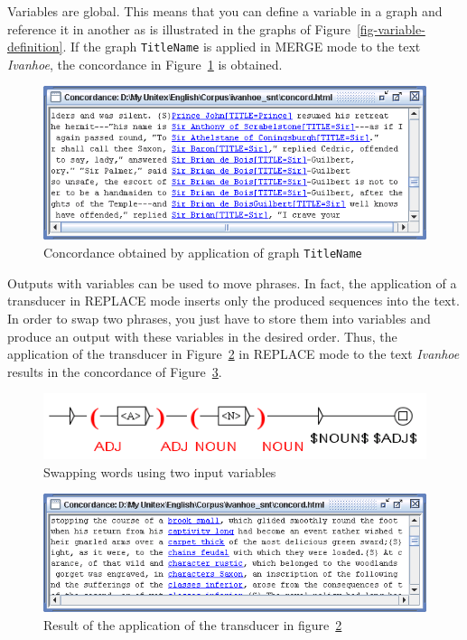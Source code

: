 \bigskip
\noindent Variables are global. This means that you can define a variable in a graph and
reference it in another as is illustrated in the graphs of
Figure~\ref{fig-variable-definition}. If the graph \verb+TitleName+ is applied in MERGE mode to the text
\textit{Ivanhoe}, the concordance in Figure~\ref{fig6-14} is obtained.

\begin{figure}[!p]
\begin{center}
\includegraphics[width=13.5cm]{resources/img/fig6-26.png}
\caption{Concordance obtained by application of graph \texttt{TitleName}\label{fig6-14}}
\end{center}
\end{figure}

\bigskip
\noindent Outputs with variables can be used to move phrases. In
fact, the application of a transducer in REPLACE mode inserts only the produced sequences
into the text. In order to swap two phrases, you just have to
store them into variables and produce an output with these variables in the
desired order. Thus, the application of the transducer in
Figure~\ref{fig-swapping-words} in REPLACE mode to the text \textit{Ivanhoe}
results in the concordance of
Figure~\ref{fig-no-space-problem}.

\begin{figure}[!ht]
\begin{center}
\includegraphics[width=11.3cm]{resources/img/fig6-27.png}
\caption{Swapping words using two input variables\label{fig-swapping-words}}
\end{center}
\end{figure}

\begin{figure}[!ht]
\begin{center}
\includegraphics[width=13.4cm]{resources/img/fig6-28.png}
\caption{Result of the application of the transducer in 
figure~\ref{fig-swapping-words}\label{fig-no-space-problem}}
\end{center}
\end{figure}

